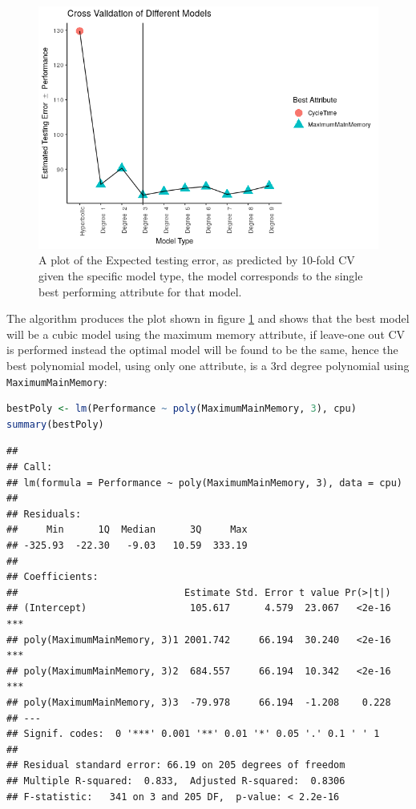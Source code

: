 \documentclass[
]{article}
\newcommand{\passthrough}[1]{#1}
\begin{document}
\begin{figure}
	\centering
	\includegraphics[width=0.7\linewidth]{SecAssignment_files/figure-html/unnamed-chunk-29-1.png}
	\caption{A plot of the Expected testing error, as predicted by 10-fold CV given the specific model type, the model corresponds to the single best performing attribute for that model.}
	\label{cfPolyBest}
\end{figure}


\newpage


The algorithm produces the plot shown in figure \ref{cfPolyBest} and shows that the best model will be a cubic model using the maximum memory attribute, if leave-one out CV is performed instead the optimal model will be found to be the same, hence the best polynomial model, using only
one attribute, is a 3rd degree polynomial using
\passthrough{\lstinline!MaximumMainMemory!}:

\begin{lstlisting}[language=R]
bestPoly <- lm(Performance ~ poly(MaximumMainMemory, 3), cpu)
summary(bestPoly)
\end{lstlisting}

\begin{lstlisting}
## 
## Call:
## lm(formula = Performance ~ poly(MaximumMainMemory, 3), data = cpu)
## 
## Residuals:
##     Min      1Q  Median      3Q     Max 
## -325.93  -22.30   -9.03   10.59  333.19 
## 
## Coefficients:
##                             Estimate Std. Error t value Pr(>|t|)    
## (Intercept)                  105.617      4.579  23.067   <2e-16 ***
## poly(MaximumMainMemory, 3)1 2001.742     66.194  30.240   <2e-16 ***
## poly(MaximumMainMemory, 3)2  684.557     66.194  10.342   <2e-16 ***
## poly(MaximumMainMemory, 3)3  -79.978     66.194  -1.208    0.228    
## ---
## Signif. codes:  0 '***' 0.001 '**' 0.01 '*' 0.05 '.' 0.1 ' ' 1
## 
## Residual standard error: 66.19 on 205 degrees of freedom
## Multiple R-squared:  0.833,  Adjusted R-squared:  0.8306 
## F-statistic:   341 on 3 and 205 DF,  p-value: < 2.2e-16
\end{lstlisting}
\end{document}

